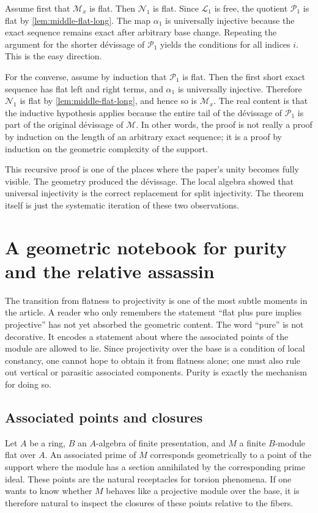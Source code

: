 \documentclass[11pt,oneside]{article}
\newcommand{\Lcal}{\mathcal L}
\newcommand{\M}{\mathcal M}
\newcommand{\N}{\mathcal N}
\newcommand{\Pcal}{\mathcal P}
\begin{document}
Assume first that $\M_x$ is flat.  Then $\N_1$ is flat.  Since $\Lcal_1$ is free, the quotient $\Pcal_1$ is flat by \cref{lem:middle-flat-long}.  The map $\alpha_1$ is universally injective because the exact sequence remains exact after arbitrary base change.  Repeating the argument for the shorter d\'evissage of $\Pcal_1$ yields the conditions for all indices $i$.  This is the easy direction.

For the converse, assume by induction that $\Pcal_1$ is flat.  Then the first short exact sequence has flat left and right terms, and $\alpha_1$ is universally injective.  Therefore $\N_1$ is flat by \cref{lem:middle-flat-long}, and hence so is $\M_x$.  The real content is that the inductive hypothesis applies because the entire tail of the d\'evissage of $\Pcal_1$ is part of the original d\'evissage of $\M$.  In other words, the proof is not really a proof by induction on the length of an arbitrary exact sequence; it is a proof by induction on the geometric complexity of the support.

This recursive proof is one of the places where the paper's unity becomes fully visible.  The geometry produced the d\'evissage.  The local algebra showed that universal injectivity is the correct replacement for split injectivity.  The theorem itself is just the systematic iteration of these two observations.

\section{A geometric notebook for purity and the relative assassin}

The transition from flatness to projectivity is one of the most subtle moments in the article.  A reader who only remembers the statement \enquote{flat plus pure implies projective} has not yet absorbed the geometric content.  The word \enquote{pure} is not decorative.  It encodes a statement about where the associated points of the module are allowed to lie.  Since projectivity over the base is a condition of local constancy, one cannot hope to obtain it from flatness alone; one must also rule out vertical or parasitic associated components.  Purity is exactly the mechanism for doing so.

\subsection{Associated points and closures}

Let $A$ be a ring, $B$ an $A$-algebra of finite presentation, and $M$ a finite $B$-module flat over $A$.  An associated prime of $M$ corresponds geometrically to a point of the support where the module has a section annihilated by the corresponding prime ideal.  These points are the natural receptacles for torsion phenomena.  If one wants to know whether $M$ behaves like a projective module over the base, it is therefore natural to inspect the closures of these points relative to the fibers.
\end{document}
